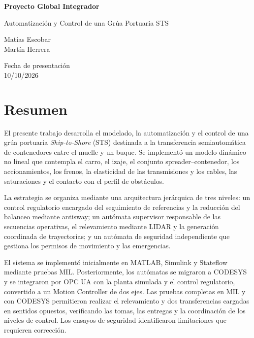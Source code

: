 \documentclass[a4paper,10pt,onecolumn,journal]{ieeeconf}
\numberwithin{equation}{section}
\begin{document}
	\begin{titlepage}
		\thispagestyle{empty}
		\centering
		\vspace*{1.2cm}
\par
		\vspace{2.0cm}
		{\LARGE\bfseries Proyecto Global Integrador\par}
		\vspace{0.8cm}
		{\Large Automatización y Control de una Grúa Portuaria STS\par}
		\vspace{2.0cm}
		{\large Matías Escobar\\ Martín Herrera\par}
		\vspace{0.8cm}
		{\large Fecha de presentación\\ 10/10/2026\par}
		\vfill
	\end{titlepage}
	\pagestyle{mystyle}
	\renewcommand{\contentsname}{Índice general}
	\tableofcontents
	\clearpage


\clearpage
\section{Resumen}

El presente trabajo desarrolla el modelado, la automatización y el control de una grúa portuaria \textit{Ship-to-Shore} (STS) destinada a la transferencia semiautomática de contenedores entre el muelle y un buque. Se implementó un modelo dinámico no lineal que contempla el carro, el izaje, el conjunto spreader--contenedor, los accionamientos, los frenos, la elasticidad de las transmisiones y los cables, las saturaciones y el contacto con el perfil de obstáculos.

La estrategia se organiza mediante una arquitectura jerárquica de tres niveles: un control regulatorio encargado del seguimiento de referencias y la reducción del balanceo mediante antisway; un autómata supervisor responsable de las secuencias operativas, el relevamiento mediante LIDAR y la generación coordinada de trayectorias; y un autómata de seguridad independiente que gestiona los permisos de movimiento y las emergencias.

El sistema se implementó inicialmente en MATLAB, Simulink y Stateflow mediante pruebas MIL. Posteriormente, los autómatas se migraron a CODESYS y se integraron por OPC UA con la planta simulada y el control regulatorio, convertido a un Motion Controller de dos ejes. Las pruebas completas en MIL y con CODESYS permitieron realizar el relevamiento y dos transferencias cargadas en sentidos opuestos, verificando las tomas, las entregas y la coordinación de los niveles de control. Los ensayos de seguridad identificaron limitaciones que requieren corrección.
\end{document}
